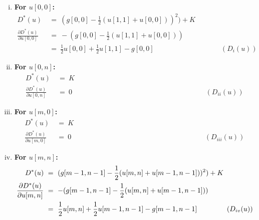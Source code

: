 \documentclass{report}
\begin{document}
					\begin{enumerate}[(i)]
						\item \textbf{For $u[0,0]$:}
						\vspace{-0.4cm}
						\begin{align*}
							D^*(u) \ & = \ (g[0,0] - \frac{1}{2} (u[1,1] + u[0,0]))^2) + K \\
							\frac{\partial D^*(u)}{\partial u[0,0]} \ & = \ - (g[0,0] - \frac{1}{2} (u[1,1] + u[0,0])) \\
							& = \ \frac{1}{2} u[0,0]  + \frac{1}{2} u[1,1] - g[0,0] \hspace{4cm} (D_{i}(u))
						\end{align*}
						\item \textbf{For $u[0,n]$:}
						\vspace{-0.4cm}
						\begin{align*}
							D^*(u) \ & = \ K \\
							\frac{\partial D^*(u)}{\partial u[0,n]} \ & = \ 0 \hspace{8cm} (D_{ii}(u))
						\end{align*}
						\item \textbf{For $u[m,0]$:}
						\vspace{-0.4cm}
						\begin{align*}
							D^*(u) \ & = \ K \\
							\frac{\partial D^*(u)}{\partial u[m,0]} \ & = \ 0 \hspace{8cm} (D_{iii}(u))
						\end{align*}
						\item \textbf{For $u[m,n]$:}
						\vspace{-0.4cm}
						\begin{align*}
							D^*(u) \ & = \ (g[m-1,n-1] - \frac{1}{2} (u[m,n] + u[m-1,n-1]))^2) + K \\
							\frac{\partial D^*(u)}{\partial u[m,n]} \ & = \ - (g[m-1,n-1] - \frac{1}{2} (u[m,n] + u[m-1,n-1])) \\
							& = \ \frac{1}{2} u[m,n]  + \frac{1}{2} u[m-1,n-1] - g[m-1,n-1] \hspace{1.5cm} (D_{iv}(u))
						\end{align*}
					\end{enumerate}
				\closesection
			\closesection
\end{document}
